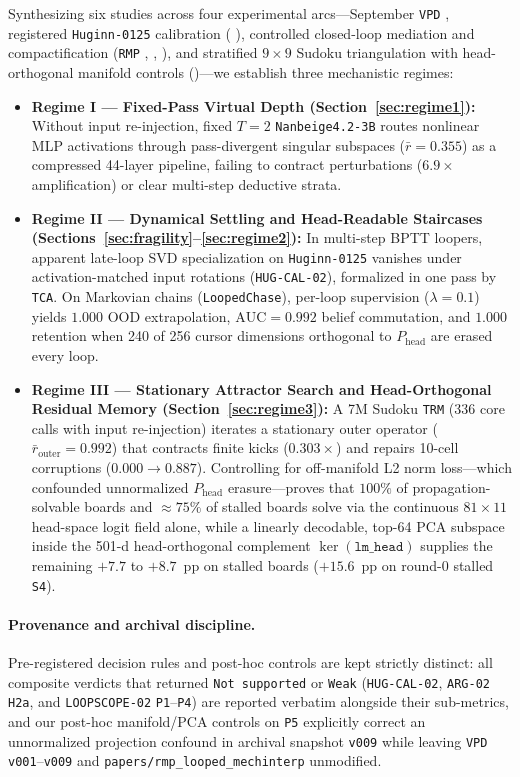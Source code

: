 \documentclass[10pt,letterpaper]{article}
\newcommand{\Phead}{P_{\mathrm{head}}}
\begin{document}
Synthesizing six studies across four experimental arcs—September \texttt{VPD} \cite{dugan2026vpd}, registered \texttt{Huginn-0125} calibration ( \cite{dugan2026hugcal}), controlled closed-loop mediation and compactification (\texttt{RMP} \cite{dugan2026rmp},  \cite{dugan2026loopscope01},  \cite{dugan2026arg02}), and stratified $9\times 9$ Sudoku triangulation with head-orthogonal manifold controls ()—we establish three mechanistic regimes:
\begin{itemize}
  \item \textbf{Regime I — Fixed-Pass Virtual Depth (Section~\ref{sec:regime1}):} Without input re-injection, fixed $T=2$ \texttt{Nanbeige4.2-3B} routes nonlinear MLP activations through pass-divergent singular subspaces ($\bar{r}=0.355$) as a compressed 44-layer pipeline, failing to contract perturbations ($6.9\times$ amplification) or clear multi-step deductive strata.
  \item \textbf{Regime II — Dynamical Settling and Head-Readable Staircases (Sections~\ref{sec:fragility}--\ref{sec:regime2}):} In multi-step BPTT loopers, apparent late-loop SVD specialization on \texttt{Huginn-0125} vanishes under activation-matched input rotations (\texttt{HUG-CAL-02}), formalized in one pass by \texttt{TCA}. On Markovian chains (\texttt{LoopedChase}), per-loop supervision ($\lambda=0.1$) yields $1.000$ OOD extrapolation, $\mathrm{AUC}=0.992$ belief commutation, and $1.000$ retention when 240 of 256 cursor dimensions orthogonal to $\Phead$ are erased every loop.
  \item \textbf{Regime III — Stationary Attractor Search and Head-Orthogonal Residual Memory (Section~\ref{sec:regime3}):} A 7M Sudoku \texttt{TRM} (336 core calls with input re-injection) iterates a stationary outer operator ($\bar{r}_{\mathrm{outer}}=0.992$) that contracts finite kicks ($0.303\times$) and repairs 10-cell corruptions ($0.000 \to 0.887$). Controlling for off-manifold L2 norm loss—which confounded unnormalized $\Phead$ erasure—proves that $100\%$ of propagation-solvable boards and $\approx 75\%$ of stalled boards solve via the continuous $81\times 11$ head-space logit field alone, while a linearly decodable, top-64 PCA subspace inside the 501-d head-orthogonal complement $\ker(\texttt{lm\_head})$ supplies the remaining $+7.7$ to $+8.7$~pp on stalled boards ($+15.6$~pp on round-0 stalled \texttt{S4}).
\end{itemize}

\paragraph{Provenance and archival discipline.} Pre-registered decision rules and post-hoc controls are kept strictly distinct: all composite verdicts that returned \texttt{Not supported} or \texttt{Weak} (\texttt{HUG-CAL-02}, \texttt{ARG-02} \texttt{H2a}, and \texttt{LOOPSCOPE-02} \texttt{P1}--\texttt{P4}) are reported verbatim alongside their sub-metrics, and our post-hoc manifold/PCA controls on \texttt{P5} explicitly correct an unnormalized projection confound in archival snapshot \texttt{v009} while leaving \texttt{VPD} \texttt{v001}--\texttt{v009} and \texttt{papers/rmp\_looped\_mechinterp} unmodified.
\end{document}
